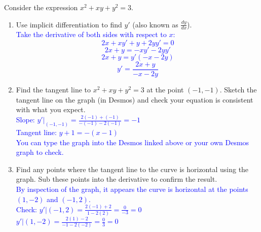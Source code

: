 \documentclass{ximera}
\begin{document}
\begin{exercise}
  Consider the expression $x^2+xy+y^2=3$. 
    \begin{center}
    \end{center}
    \begin{enumerate}
      \item Use implicit differentiation to find $y'$ (also known as $\frac{dy}{dx}$).  \\
      \textcolor{blue}{Take the derivative of both sides with respect to $x$:
      \[2x+xy'+y+2yy'=0\]
      \[2x+y=-xy'-2yy'\]
      \[2x+y=y'(-x-2y)\]
      \[y'=\frac{2x+y}{-x-2y}\]}
      \item Find the tangent line to $x^2+xy+y^2=3$ at the point $(-1,-1)$.  Sketch the tangent line on the graph (in Desmos) and check your equation is consistent with what you expect.  \\
      \textcolor{blue}{Slope: $y'\bigg|_{(-1,-1)}=\frac{2(-1)+(-1)}{-(-1)-2(-1)}=-1$\\
      Tangent line: $y+1=-(x-1)$\\
      You can type the graph into the Desmos linked above or your own Desmos graph to check.}
      \item Find any points where the tangent line to the curve is horizontal using the graph.  Sub these points into the derivative to confirm the result.\\
      \textcolor{blue}{By inspection of the graph, it appears the curve is horizontal at the points $(1,-2)$ and $(-1,2)$. \\
      Check: $y'\bigg|(-1,2)=\frac{2(-1)+2}{1-2(2)}=\frac{0}{-3}=0$\\
      $y'\bigg|(1,-2)=\frac{2(1)-2}{-1-2(-2)}=\frac{0}{3}=0$}
    \end{enumerate}
\end{exercise}
\end{document}
